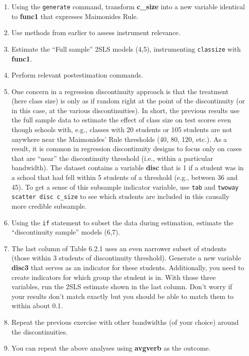 \documentclass[a4paper,12pt]{article}
\begin{document}
\begin{enumerate}
\item Using the \texttt{generate} command, transform \textbf{c\_size} into a new variable identical to \textbf{func1} that expresses Maimonides Rule.

\item Use methods from earlier to assess instrument relevance.

\item Estimate the ``Full sample'' 2SLS models (4,5), instrumenting \texttt{classize} with \textbf{func1}.

\item Perform relevant postestimation commands.

\item One concern in a regression discontinuity approach is that the treatment (here class size) is only as if random right at the point of the discontinuity (or in this case, at the various discontinuities). In short, the previous results use the full sample data to estimate the effect of class size on test scores even though schools with, e.g., classes with 20 students or 105 students are not anywhere near the Maimonides' Rule thresholds (40, 80, 120, etc.). As a result, it is common in regression discontinuity designs to focus only on cases that are ``near'' the discontinuity threshold (i.e., within a particular bandwidth). The dataset contains a variable \textbf{disc} that is 1 if a student was in a school that had fell within 5 students of a threshold (e.g., between 36 and 45). To get a sense of this subsample indicator variable, use \texttt{tab} and \texttt{twoway scatter disc c\_size} to see which students are included in this causally more credible subsample.

\item Using the \texttt{if} statement to subset the data during estimation, estimate the ``discontinuity sample'' models (6,7).

\item The last column of Table 6.2.1 uses an even narrower subset of students (those within 3 students of discontinuity threshold). Generate a new variable \textbf{disc3} that serves as an indicator for these students. Additionally, you need to create indicators for which group the student is in. With those three variables, run the 2SLS estimate shown in the last column. Don't worry if your results don't match exactly but you should be able to match them to within about 0.1.

\item Repeat the previous exercise with other bandwidths (of your choice) around the discontinuities.

\item You can repeat the above analyses using \textbf{avgverb} as the outcome.

\end{enumerate}
\end{document}
